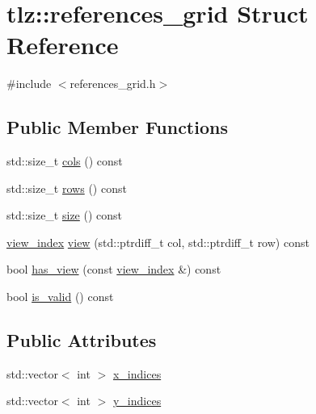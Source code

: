 \hypertarget{structtlz_1_1references__grid}{}\section{tlz\+:\+:references\+\_\+grid Struct Reference}
\label{structtlz_1_1references__grid}


{\ttfamily \#include $<$references\+\_\+grid.\+h$>$}

\subsection*{Public Member Functions}
\begin{DoxyCompactItemize}
\item 
std\+::size\+\_\+t \hyperlink{structtlz_1_1references__grid_ac2d383bed7f034aa729ae386b689ad6d}{cols} () const 
\item 
std\+::size\+\_\+t \hyperlink{structtlz_1_1references__grid_a5b4c4debbacfe143fd93753c04d84bca}{rows} () const 
\item 
std\+::size\+\_\+t \hyperlink{structtlz_1_1references__grid_abb7ee341d99b5074db995066ac0381e3}{size} () const 
\item 
\hyperlink{structtlz_1_1view__index}{view\+\_\+index} \hyperlink{structtlz_1_1references__grid_a3ad2b6212dea0a1b71addfee4fc6bfba}{view} (std\+::ptrdiff\+\_\+t col, std\+::ptrdiff\+\_\+t row) const 
\item 
bool \hyperlink{structtlz_1_1references__grid_a14d7b4abd9087b92b5061f9d1a0c4745}{has\+\_\+view} (const \hyperlink{structtlz_1_1view__index}{view\+\_\+index} \&) const 
\item 
bool \hyperlink{structtlz_1_1references__grid_a2c9d1b6e2da6f8b552267b931d671ad6}{is\+\_\+valid} () const 
\end{DoxyCompactItemize}
\subsection*{Public Attributes}
\begin{DoxyCompactItemize}
\item 
std\+::vector$<$ int $>$ \hyperlink{structtlz_1_1references__grid_aba58bb7684995d774802d94618682191}{x\+\_\+indices}
\item 
std\+::vector$<$ int $>$ \hyperlink{structtlz_1_1references__grid_ac4c88688e9e6a6333f0978245e00c692}{y\+\_\+indices}
\end{DoxyCompactItemize}


